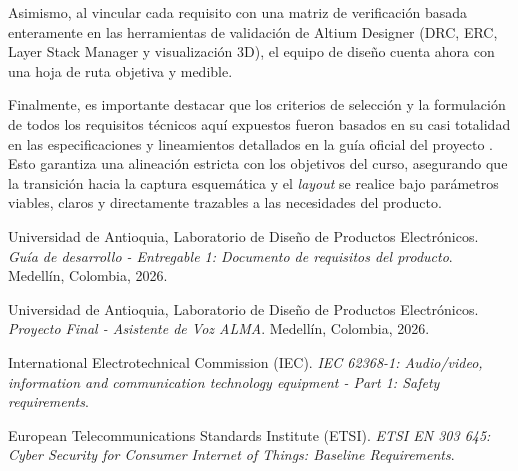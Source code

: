 \documentclass[%
	paper=a4,				%
	twoside=false,				%
	parskip=half,				%
	chapterprefix=false, 		%
	10pt,						%
	headings=normal,			%
	bibliography=totoc,			%
	listof=totoc,				%
	titlepage=on,				%
	captions=tableabove,		%
	draft=false,				%
]{scrbook}%
\begin{document}
Asimismo, al vincular cada requisito con una matriz de verificación basada enteramente en las herramientas de validación de Altium Designer (DRC, ERC, Layer Stack Manager y visualización 3D), el equipo de diseño cuenta ahora con una hoja de ruta objetiva y medible. 

Finalmente, es importante destacar que los criterios de selección y la formulación de todos los requisitos técnicos aquí expuestos fueron basados en su casi totalidad en las especificaciones y lineamientos detallados en la guía oficial del proyecto \cite{guia_proyecto_final}. Esto garantiza una alineación estricta con los objetivos del curso, asegurando que la transición hacia la captura esquemática y el \textit{layout} se realice bajo parámetros viables, claros y directamente trazables a las necesidades del producto.
\renewcommand{\bibname}{Referencias} %
\begin{thebibliography}{99}

Universidad de Antioquia, Laboratorio de Diseño de Productos Electrónicos. \textit{Guía de desarrollo - Entregable 1: Documento de requisitos del producto}. Medellín, Colombia, 2026.

Universidad de Antioquia, Laboratorio de Diseño de Productos Electrónicos. \textit{Proyecto Final - Asistente de Voz ALMA}. Medellín, Colombia, 2026.

International Electrotechnical Commission (IEC). \textit{IEC 62368-1: Audio/video, information and communication technology equipment - Part 1: Safety requirements}. 

European Telecommunications Standards Institute (ETSI). \textit{ETSI EN 303 645: Cyber Security for Consumer Internet of Things: Baseline Requirements}.

\end{thebibliography}
\end{document}
